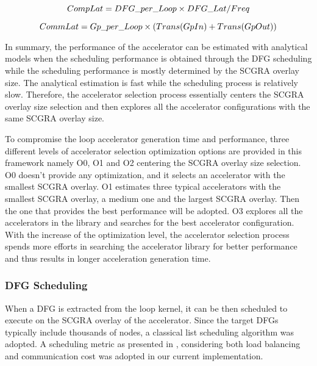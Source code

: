 \begin{equation} \label{eq:comp-lat}
    \footnotesize
    CompLat = DFG\_per\_Loop \times DFG\_Lat / Freq
\end{equation}


\begin{equation} \label{eq:comm-lat}
    \footnotesize
    CommLat = Gp\_per\_Loop \times (Trans(GpIn) + Trans(GpOut))
\end{equation}


In summary, the performance of the accelerator can be estimated with analytical models when the scheduling
performance is obtained through the DFG scheduling while the scheduling performance is mostly determined
by the SCGRA overlay size. The analytical estimation is fast while the scheduling process is
relatively slow. Therefore, the accelerator selection process essentially centers the SCGRA
overlay size selection and then explores all the accelerator configurations with the same SCGRA overlay size. 

To compromise the loop accelerator generation time and performance, three different levels of
accelerator selection optimization options are provided in this framework namely O0, O1 and O2
centering the SCGRA overlay size selection.
O0 doesn't provide any optimization, and it selects an accelerator with the smallest SCGRA overlay.
O1 estimates three typical accelerators with the smallest SCGRA overlay, a medium one and the
largest SCGRA overlay. Then the one that provides the best performance will be adopted. O3 explores all
the accelerators in the library and searches for the best accelerator configuration. With the
increase of the optimization level, the accelerator selection process spends more efforts in
searching the accelerator library for better performance and thus results in longer acceleration
generation time.

\subsubsection{DFG Scheduling}
When a DFG is extracted from the loop kernel, it can be then scheduled to execute on the
SCGRA overlay of the accelerator. Since the target DFGs typically include thousands of nodes, a
classical list scheduling algorithm \cite{schutten1996list} was adopted. A scheduling metric as
presented in \cite{colinheart}, considering both load balancing and communication cost was adopted
in our current implementation. 

